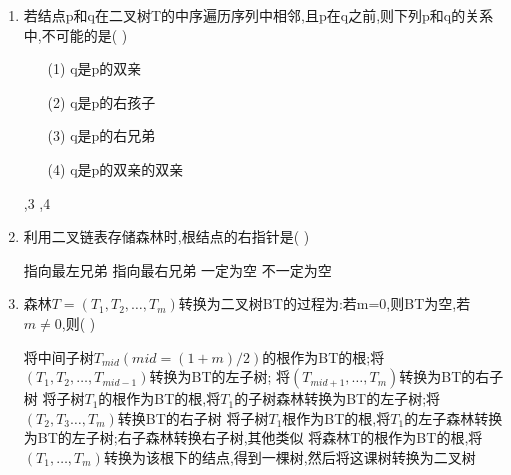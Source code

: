 \documentclass[12pt, a4paper, oneside, UTF8]{ctexbook}
\begin{document}
\begin{enumerate}
    \item \bl 若结点p和q在二叉树T的中序遍历序列中相邻,且p在q之前,则下列p和q的关系中,不可能的是(    )
    \begin{enumerate}
        \item [(1)] q是p的双亲 
        \item [(2)] q是p的右孩子
        \item [(3)] q是p的右兄弟
        \item [(4)] q是p的双亲的双亲
    \end{enumerate}
    \begin{choices}
        ,3
        ,4
    \end{choices}


    \item 利用二叉链表存储森林时,根结点的右指针是(    ) 
    \begin{choices}
        \task 指向最左兄弟 
        \task 指向最右兄弟 
        \task 一定为空
        \task 不一定为空 
    \end{choices}

    \item 森林$T=(T_1,T_2,\ldots,T_m)$转换为二叉树BT的过程为:若m=0,则BT为空,若$m\neq 0$,则(    ) 
    \begin{choices}[1]
        \task 将中间子树$T_{mid}(mid=(1+m)/2)$的根作为BT的根;将$(T_1,T_2,\ldots,T_{mid-1})$转换为BT的左子树;
        将$(T_{mid+1},\ldots,T_m)$转换为BT的右子树 
        \task 将子树$T_1$的根作为BT的根,将$T_1$的子树森林转换为BT的左子树;将$(T_2,T_3\ldots,T_m)$转换BT的右子树 
        \task 将子树$T_1$根作为BT的根,将$T_1$的左子森林转换为BT的左子树;右子森林转换右子树,其他类似 
        \task 将森林T的根作为BT的根,将$(T_1,\ldots,T_m)$转换为该根下的结点,得到一棵树,然后将这课树转换为二叉树 
    \end{choices}



\end{enumerate}
\end{document}
